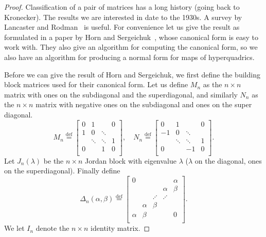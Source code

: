 \documentclass[12pt,openany]{book}
\theoremstyle{plain}
\theoremstyle{remark}
\theoremstyle{definition}
\theoremstyle{exercise}
\theoremstyle{example}
\begin{document}
\begin{proof}
Classification of a pair of matrices has a long history (going back to
Kronecker).  The results we are interested in date to the 1930s.
A survey by Lancaster and Rodman~\cite{LancasterRodman} is useful.
For convenience let us give the result as formulated in a paper by
Horn and Sergeichuk~\cite{HornSergeichuk},
whose canonical form is easy to work with.
They also give an algorithm for computing the canonical form, so we also
have an algorithm for producing a normal form for maps of hyperquadrics.

Before we can give the result of Horn and Sergeichuk, we first define
the building block matrices used for their canonical form.
Let us define $M_n$ as the $n \times n$ matrix with ones on the subdiagonal
and the superdiagonal, and similarly
$N_n$ as the $n \times n$ matrix with negative ones on the subdiagonal
and ones on the super diagonal.
\begin{equation}
M_n \overset{\text{def}}{=}
\begin{bmatrix}
0 & 1 & & 0 \\
1 & 0 & \ddots &  \\
& \ddots & \ddots & 1 \\
0 & & 1 & 0 \\
\end{bmatrix}
, \quad
N_n \overset{\text{def}}{=}
\begin{bmatrix}
0 & 1 & & 0 \\
-1 & 0 & \ddots &  \\
& \ddots & \ddots & 1 \\
0 & & -1 & 0 \\
\end{bmatrix} .
\end{equation}
Let $J_n(\lambda)$ be the $n \times n$ Jordan block with eigenvalue $\lambda$
($\lambda$ on the diagonal, ones on the superdiagonal).  Finally define
\begin{equation}
\Delta_n(\alpha,\beta) \overset{\text{def}}{=} 
\begin{bmatrix}
0 & & & & \alpha \\
& & & \alpha & \beta \\
& & \iddots & \iddots & \\
& \alpha & \beta & & \\
\alpha & \beta & & & 0 \\
\end{bmatrix} .
\end{equation}
We let $I_n$ denote the $n \times n$ identity matrix.


\end{proof}
\end{document}
